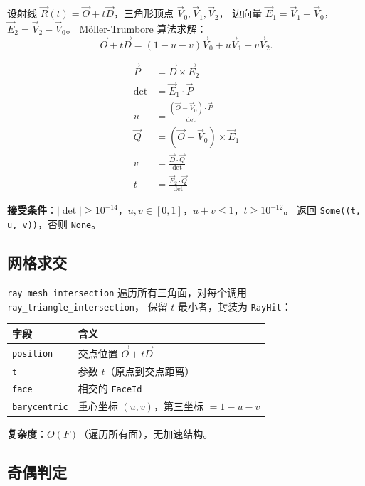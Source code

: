 \documentclass[11pt,a4paper]{article}
\begin{document}
设射线 $\vec{R}(t) = \vec{O} + t\vec{D}$，三角形顶点 $\vec{V}_0, \vec{V}_1, \vec{V}_2$，
边向量 $\vec{E}_1 = \vec{V}_1 - \vec{V}_0$，$\vec{E}_2 = \vec{V}_2 - \vec{V}_0$。
Möller-Trumbore 算法求解：
\[
  \vec{O} + t\vec{D} = (1 - u - v)\vec{V}_0 + u\vec{V}_1 + v\vec{V}_2.
\]

\begin{align}
  \vec{P} &= \vec{D} \times \vec{E}_2 \\
  \det &= \vec{E}_1 \cdot \vec{P} \\
  u &= \frac{(\vec{O} - \vec{V}_0) \cdot \vec{P}}{\det} \\
  \vec{Q} &= (\vec{O} - \vec{V}_0) \times \vec{E}_1 \\
  v &= \frac{\vec{D} \cdot \vec{Q}}{\det} \\
  t &= \frac{\vec{E}_2 \cdot \vec{Q}}{\det}
\end{align}

\textbf{接受条件}：$|\det| \ge 10^{-14}$，$u, v \in [0, 1]$，$u + v \le 1$，$t \ge 10^{-12}$。
返回 \texttt{Some((t, u, v))}，否则 \texttt{None}。

\subsection{网格求交}

\texttt{ray\_mesh\_intersection} 遍历所有三角面，对每个调用 \texttt{ray\_triangle\_intersection}，
保留 $t$ 最小者，封装为 \texttt{RayHit}：

\begin{center}
\begin{tabular}{@{}ll@{}}
  \toprule
  \textbf{字段} & \textbf{含义} \\
  \midrule
  \texttt{position} & 交点位置 $\vec{O} + t\vec{D}$ \\
  \texttt{t}        & 参数 $t$（原点到交点距离） \\
  \texttt{face}     & 相交的 \texttt{FaceId} \\
  \texttt{barycentric} & 重心坐标 $(u, v)$，第三坐标 $= 1-u-v$ \\
  \bottomrule
\end{tabular}
\end{center}

\textbf{复杂度}：$O(F)$（遍历所有面），无加速结构。

\subsection{奇偶判定}
\end{document}
